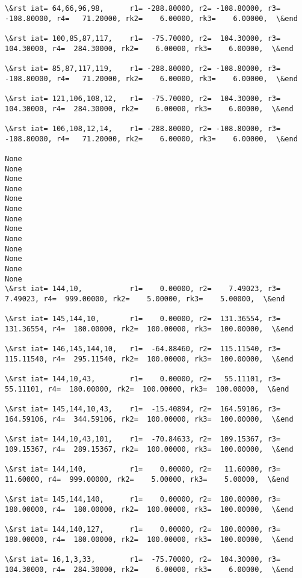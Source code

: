 \documentclass[11pt]{article}
\begin{document}
\begin{Verbatim}[commandchars=\\\{\}]
\&rst iat= 64,66,96,98,      r1= -288.80000, r2= -108.80000, r3= -108.80000, r4=   71.20000, rk2=    6.00000, rk3=    6.00000,  \&end

\&rst iat= 100,85,87,117,    r1=  -75.70000, r2=  104.30000, r3=  104.30000, r4=  284.30000, rk2=    6.00000, rk3=    6.00000,  \&end

\&rst iat= 85,87,117,119,    r1= -288.80000, r2= -108.80000, r3= -108.80000, r4=   71.20000, rk2=    6.00000, rk3=    6.00000,  \&end

\&rst iat= 121,106,108,12,   r1=  -75.70000, r2=  104.30000, r3=  104.30000, r4=  284.30000, rk2=    6.00000, rk3=    6.00000,  \&end

\&rst iat= 106,108,12,14,    r1= -288.80000, r2= -108.80000, r3= -108.80000, r4=   71.20000, rk2=    6.00000, rk3=    6.00000,  \&end

None
None
None
None
None
None
None
None
None
None
None
None
None
\&rst iat= 144,10,           r1=    0.00000, r2=    7.49023, r3=    7.49023, r4=  999.00000, rk2=    5.00000, rk3=    5.00000,  \&end

\&rst iat= 145,144,10,       r1=    0.00000, r2=  131.36554, r3=  131.36554, r4=  180.00000, rk2=  100.00000, rk3=  100.00000,  \&end

\&rst iat= 146,145,144,10,   r1=  -64.88460, r2=  115.11540, r3=  115.11540, r4=  295.11540, rk2=  100.00000, rk3=  100.00000,  \&end

\&rst iat= 144,10,43,        r1=    0.00000, r2=   55.11101, r3=   55.11101, r4=  180.00000, rk2=  100.00000, rk3=  100.00000,  \&end

\&rst iat= 145,144,10,43,    r1=  -15.40894, r2=  164.59106, r3=  164.59106, r4=  344.59106, rk2=  100.00000, rk3=  100.00000,  \&end

\&rst iat= 144,10,43,101,    r1=  -70.84633, r2=  109.15367, r3=  109.15367, r4=  289.15367, rk2=  100.00000, rk3=  100.00000,  \&end

\&rst iat= 144,140,          r1=    0.00000, r2=   11.60000, r3=   11.60000, r4=  999.00000, rk2=    5.00000, rk3=    5.00000,  \&end

\&rst iat= 145,144,140,      r1=    0.00000, r2=  180.00000, r3=  180.00000, r4=  180.00000, rk2=  100.00000, rk3=  100.00000,  \&end

\&rst iat= 144,140,127,      r1=    0.00000, r2=  180.00000, r3=  180.00000, r4=  180.00000, rk2=  100.00000, rk3=  100.00000,  \&end

\&rst iat= 16,1,3,33,        r1=  -75.70000, r2=  104.30000, r3=  104.30000, r4=  284.30000, rk2=    6.00000, rk3=    6.00000,  \&end


\end{Verbatim}
\end{document}
